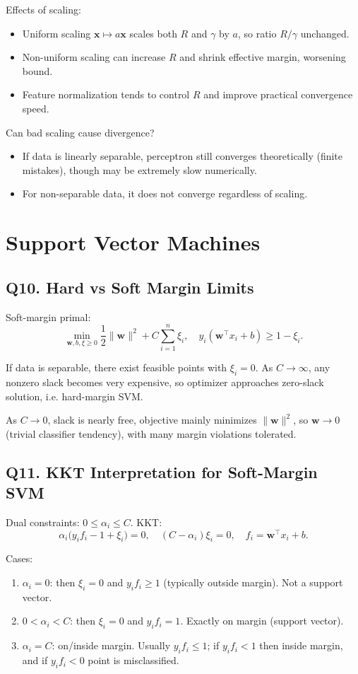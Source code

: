 \documentclass[11pt]{article}
\newcommand{\1}{\mathbf{1}}
\newcommand{\xx}{\mathbf{x}}
\newcommand{\ww}{\mathbf{w}}
\begin{document}
Effects of scaling:
\begin{itemize}
\item Uniform scaling $\xx\mapsto a\xx$ scales both $R$ and $\gamma$ by $a$, so ratio $R/\gamma$ unchanged.
\item Non-uniform scaling can increase $R$ and shrink effective margin, worsening bound.
\item Feature normalization tends to control $R$ and improve practical convergence speed.
\end{itemize}

Can bad scaling cause divergence?
\begin{itemize}
\item If data is linearly separable, perceptron still converges theoretically (finite mistakes), though may be extremely slow numerically.
\item For non-separable data, it does not converge regardless of scaling.
\end{itemize}

\section{Support Vector Machines}

\subsection*{Q10. Hard vs Soft Margin Limits}
Soft-margin primal:
\[
\min_{\ww,b,\xi\ge0}\frac12\|\ww\|^2+C\sum_{i=1}^n\xi_i,
\quad y_i(\ww^\top x_i+b)\ge1-\xi_i.
\]

If data is separable, there exist feasible points with $\xi_i=0$. As $C\to\infty$, any nonzero slack becomes very expensive, so optimizer approaches zero-slack solution, i.e. hard-margin SVM.

As $C\to0$, slack is nearly free, objective mainly minimizes $\|\ww\|^2$, so $\ww\to0$ (trivial classifier tendency), with many margin violations tolerated.

\subsection*{Q11. KKT Interpretation for Soft-Margin SVM}
Dual constraints: $0\le\alpha_i\le C$.
KKT:
\[
\alpha_i\big(y_if_i-1+\xi_i\big)=0,
\quad (C-\alpha_i)\xi_i=0,
\quad f_i=\ww^\top x_i+b.
\]

Cases:
\begin{enumerate}
\item $\alpha_i=0$: then $\xi_i=0$ and $y_if_i\ge1$ (typically outside margin). Not a support vector.
\item $0<\alpha_i<C$: then $\xi_i=0$ and $y_if_i=1$. Exactly on margin (support vector).
\item $\alpha_i=C$: on/inside margin. Usually $y_if_i\le1$; if $y_if_i<1$ then inside margin, and if $y_if_i<0$ point is misclassified.
\end{enumerate}
\end{document}

